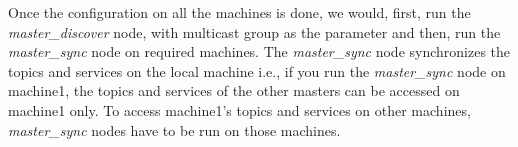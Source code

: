 Once the configuration on all the machines is done, we would, first, run the \textit{master\_discover} node, with multicast group as the parameter and then, run the \textit{master\_sync} node on required machines. The \textit{master\_sync} node synchronizes the topics and services on the local machine i.e., if you run the \textit{master\_sync} node on machine1, the topics and services of the other masters can be accessed on machine1 only. To access machine1's topics and services on other machines, \textit{master\_sync} nodes have to be run on those machines.








